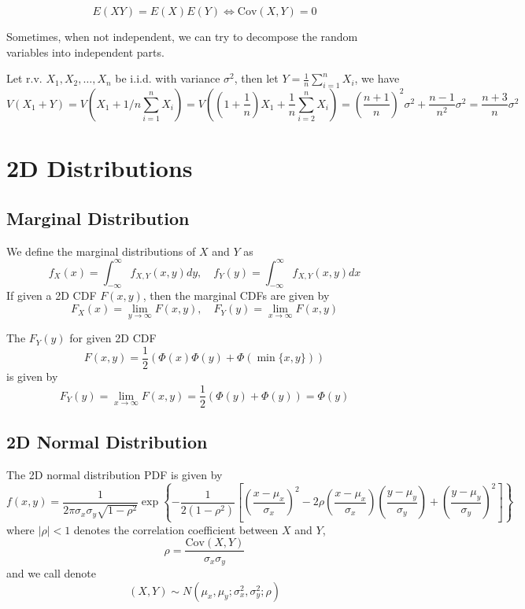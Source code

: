 \documentclass{template}
\newcommand{\Cov}{\text{Cov}}
\begin{document}
\begin{theorem}
	\[
	E(XY) = E(X)E(Y) \iff \Cov(X, Y) = 0
	\] 
\end{theorem}

Sometimes, when not independent, we can try to decompose the random variables into
independent parts.
\begin{example}
	Let r.v. $X_1, X_2, \ldots, X_n$ be i.i.d. with variance $\sigma^2$, then let $Y = \frac{1}{n}\sum_{i=1}^{n} X_i$, 
we have
\[
	V(X_1+ Y) = V(X_1 + 1/n \sum_{i=1}^{n} X_i) = V\left((1+\frac{1}{n})X_1 + \frac{1}{n} \sum_{i=2}^{n} X_i\right)
	= \left(\frac{n+1}{n}\right)^2 \sigma^2 + \frac{n-1}{n^2} \sigma^2 
	= \frac{n+3}{n} \sigma^2
\] 
	
\end{example}

\section{2D Distributions}

\subsection{Marginal Distribution}

We define the marginal distributions of \( X \) and \( Y \) as
\[
	f_X(x) = \int_{-\infty}^{\infty} f_{X, Y}(x, y) dy, \quad
	f_Y(y) = \int_{-\infty}^{\infty} f_{X, Y}(x, y) dx
\] 
If given a 2D CDF \( F(x, y) \), then the marginal CDFs are given by
\[
	F_X(x) = \lim_{y \to \infty} F(x, y), \quad
	F_Y(y) = \lim_{x \to \infty} F(x, y)
\] 

\begin{example}
	The $F_Y(y)$ for given 2D CDF
	 \[
		 F(x, y) = \frac{1}{2} \left(\Phi(x)\Phi(y) + \Phi(\min\{x, y\})\right)
	\] 
	is given by
	\[
		F_Y(y) = \lim_{x \to \infty} F(x, y) = \frac{1}{2} \left(\Phi(y) + \Phi(y)\right) = \Phi(y)
	\]
	
\end{example}

\subsection{2D Normal Distribution}
The 2D normal distribution PDF is given by
\[
	f(x, y) = \frac{1}{2\pi \sigma_x \sigma_y \sqrt{1-\rho^2}}
	\exp\left\{-\frac{1}{2(1-\rho^2)} \left[ \left(\frac{x-\mu_x}{\sigma_x}\right)^2
	- 2\rho \left(\frac{x-\mu_x}{\sigma_x}\right)\left(\frac{y-\mu_y}{\sigma_y}\right) + \left(\frac{y-\mu_y}{\sigma_y}\right)^2 \right] \right\}
\] 
where $|\rho|<1$ denotes the correlation coefficient between $X$ and $Y$,
\[
	\rho = \frac{\Cov(X, Y)}{\sigma_x \sigma_y}
\] 
and we call denote
\[
	(X, Y) \sim N(\mu_x, \mu_y; \sigma_x^2, \sigma_y^2; \rho)
\] 
\end{document}
